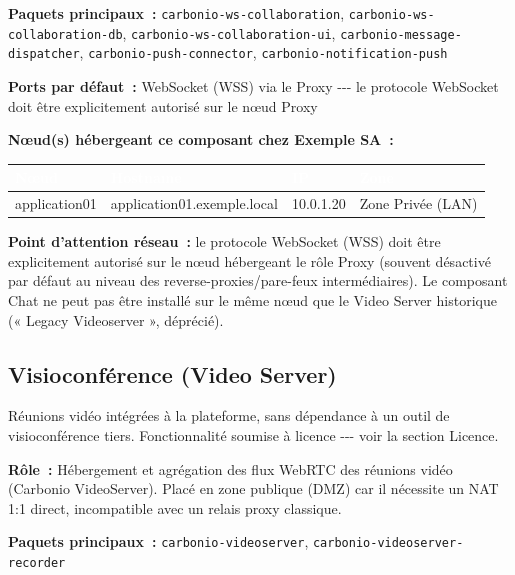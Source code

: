 \documentclass[11pt,a4paper]{report}
\newcommand{\tblhead}[1]{\textcolor{white}{\textbf{#1}}}
\begin{document}
\textbf{Paquets principaux~:} \texttt{carbonio-\allowbreak{}ws-\allowbreak{}collaboration}, \texttt{carbonio-\allowbreak{}ws-\allowbreak{}collaboration-\allowbreak{}db}, \texttt{carbonio-\allowbreak{}ws-\allowbreak{}collaboration-\allowbreak{}ui}, \texttt{carbonio-\allowbreak{}message-\allowbreak{}dispatcher}, \texttt{carbonio-\allowbreak{}push-\allowbreak{}connector}, \texttt{carbonio-\allowbreak{}notification-\allowbreak{}push}

\textbf{Ports par défaut~:} WebSocket (WSS) via le Proxy -\allowbreak{}-\allowbreak{}-\allowbreak{} le protocole WebSocket doit être explicitement autorisé sur le nœud Proxy

\textbf{Nœud(s) hébergeant ce composant chez Exemple SA~:}
\begin{longtable}{|p{3.2cm}|p{4.5cm}|p{3.2cm}|p{2.3cm}|}
\hline
\rowcolor{primary}\tblhead{Nœud} & \tblhead{Hostname} & \tblhead{IP} & \tblhead{Zone} \\
\hline
\endhead
application01 & application01.\allowbreak{}exemple.\allowbreak{}local & 10.\allowbreak{}0.\allowbreak{}1.\allowbreak{}20 & Zone Privée (LAN) \\
\hline
\end{longtable}

\textbf{Point d'attention réseau~:} le protocole WebSocket (WSS) doit être explicitement autorisé sur le nœud hébergeant le rôle Proxy (souvent désactivé par défaut au niveau des reverse-proxies/pare-feux intermédiaires). Le composant Chat ne peut pas être installé sur le même nœud que le Video Server historique (« Legacy Videoserver », déprécié).

\subsection{Visioconférence (Video Server)}

Réunions vidéo intégrées à la plateforme, sans dépendance à un outil de visioconférence tiers.\allowbreak{} Fonctionnalité soumise à licence -\allowbreak{}-\allowbreak{}-\allowbreak{} voir la section Licence.\allowbreak{}

\textbf{Rôle~:} Hébergement et agrégation des flux WebRTC des réunions vidéo (Carbonio VideoServer).\allowbreak{} Placé en zone publique (DMZ) car il nécessite un NAT 1:1 direct, incompatible avec un relais proxy classique.\allowbreak{}

\textbf{Paquets principaux~:} \texttt{carbonio-\allowbreak{}videoserver}, \texttt{carbonio-\allowbreak{}videoserver-\allowbreak{}recorder}
\end{document}
